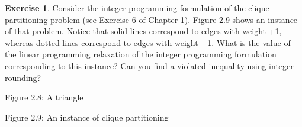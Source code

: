 \documentclass[titlepage]{book}
\theoremstyle{plain}
\theoremstyle{definition}
\newtheorem{exercise}{Exercise}[chapter]
\theoremstyle{remark}
\begin{document}
\begin{exercise}
Consider the integer programming formulation of the clique partitioning problem (see Exercise 6 of
Chapter 1). Figure 2.9 shows an instance of that problem. Notice that solid lines correspond to edges
with weight +1, whereas dotted lines correspond to edges with weight −1. What is the value of the linear
programming relaxation of the integer programming formulation corresponding to this instance? Can
you find a violated inequality using integer rounding?
\end{exercise}

Figure 2.8: A triangle


Figure 2.9: An instance of clique partitioning



\printindex
\glsaddall
{}
\printglossaries
\end{document}
